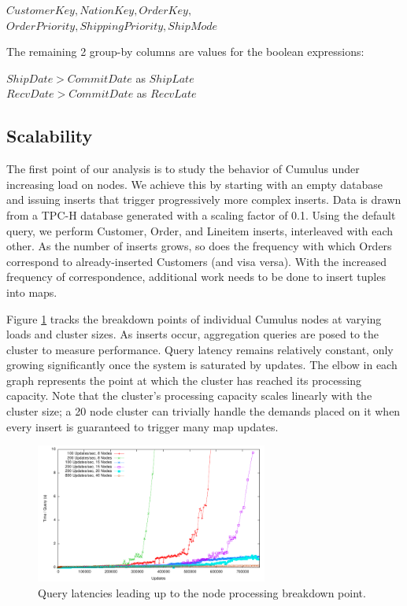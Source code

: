 {\noindent $CustomerKey, NationKey, OrderKey,$ \\
$OrderPriority, ShippingPriority, ShipMode$}

\noindent The remaining 2 group-by columns are values for the boolean expressions:

{\noindent $ShipDate > CommitDate$ as $ShipLate$\\
$RecvDate > CommitDate$ as $RecvLate$}

\subsection{Scalability}

The first point of our analysis is to study the behavior of Cumulus under increasing load on nodes.  We achieve this by starting with an empty database and issuing inserts that trigger progressively more complex inserts.  Data is drawn from a TPC-H database generated with a scaling factor of 0.1.  Using the default query, we perform Customer, Order, and Lineitem inserts, interleaved with each other.  As the number of inserts grows, so does the frequency with which Orders correspond to already-inserted Customers (and visa versa).  With the increased frequency of correspondence, additional work needs to be done to insert tuples into maps.  

Figure \ref{fig:expandingbreakdown} tracks the breakdown points of individual Cumulus nodes at varying loads and cluster sizes.  As inserts occur, aggregation queries are posed to the cluster to measure performance.  Query latency remains relatively constant, only growing significantly once the system is saturated by updates.  The elbow in each graph represents the point at which the cluster has reached its processing capacity.  Note that the cluster's processing capacity scales linearly with the cluster size; a 20 node cluster can trivially handle the demands placed on it when every insert is guaranteed to trigger many map updates.

\begin{figure}
\begin{center}
\includegraphics[width=3.0in]{images/expandingbreakdown.pdf}
\caption{Query latencies leading up to the node processing breakdown point.}
\label{fig:expandingbreakdown}
\end{center}
\end{figure}


